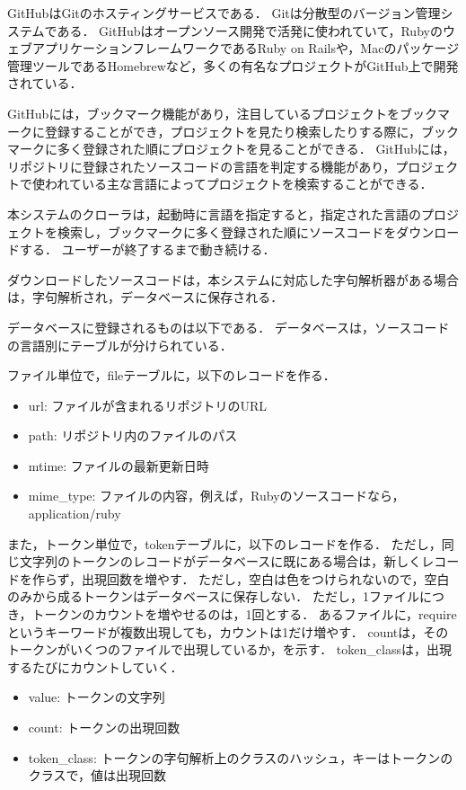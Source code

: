 \documentclass{cs-thesis}
\begin{document}
  GitHubはGitのホスティングサービスである．
  Gitは分散型のバージョン管理システムである．
  GitHubはオープンソース開発で活発に使われていて，RubyのウェブアプリケーションフレームワークであるRuby on Railsや，Macのパッケージ管理ツールであるHomebrewなど，多くの有名なプロジェクトがGitHub上で開発されている．

  GitHubには，ブックマーク機能があり，注目しているプロジェクトをブックマークに登録することができ，プロジェクトを見たり検索したりする際に，ブックマークに多く登録された順にプロジェクトを見ることができる．
  GitHubには，リポジトリに登録されたソースコードの言語を判定する機能があり，プロジェクトで使われている主な言語によってプロジェクトを検索することができる．

  本システムのクローラは，起動時に言語を指定すると，指定された言語のプロジェクトを検索し，ブックマークに多く登録された順にソースコードをダウンロードする．
  ユーザーが終了するまで動き続ける．

  ダウンロードしたソースコードは，本システムに対応した字句解析器がある場合は，字句解析され，データベースに保存される．

  データベースに登録されるものは以下である．
  データベースは，ソースコードの言語別にテーブルが分けられている．

  ファイル単位で，fileテーブルに，以下のレコードを作る．

\begin{itemize}
 \item url: ファイルが含まれるリポジトリのURL
 \item path: リポジトリ内のファイルのパス
 \item mtime: ファイルの最新更新日時
 \item mime\_type: ファイルの内容，例えば，Rubyのソースコードなら，application/ruby
\end{itemize}

  また，トークン単位で，tokenテーブルに，以下のレコードを作る．
  ただし，同じ文字列のトークンのレコードがデータベースに既にある場合は，新しくレコードを作らず，出現回数を増やす．
  ただし，空白は色をつけられないので，空白のみから成るトークンはデータベースに保存しない．
  ただし，1ファイルにつき，トークンのカウントを増やせるのは，1回とする．
  あるファイルに，requireというキーワードが複数出現しても，カウントは1だけ増やす．
  countは，そのトークンがいくつのファイルで出現しているか，を示す．
  token\_classは，出現するたびにカウントしていく．

  \begin{itemize}
   \item value: トークンの文字列
   \item count: トークンの出現回数
   \item token\_class: トークンの字句解析上のクラスのハッシュ，キーはトークンのクラスで，値は出現回数
  \end{itemize}
\end{document}
